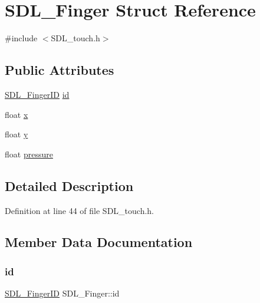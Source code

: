 \hypertarget{struct_s_d_l___finger}{}\section{S\+D\+L\+\_\+\+Finger Struct Reference}
\label{struct_s_d_l___finger}


{\ttfamily \#include $<$S\+D\+L\+\_\+touch.\+h$>$}

\subsection*{Public Attributes}
\begin{DoxyCompactItemize}
\item 
\mbox{\hyperlink{_s_d_l__touch_8h_a5fa58141f78415ca09645af359ad2250}{S\+D\+L\+\_\+\+Finger\+ID}} \mbox{\hyperlink{struct_s_d_l___finger_a3cec630146eeec5bd6299a9387a6f16a}{id}}
\item 
float \mbox{\hyperlink{struct_s_d_l___finger_ab91dfbd03c3215560457fef44e1c7755}{x}}
\item 
float \mbox{\hyperlink{struct_s_d_l___finger_a0a2c7a06ae641940111e03801c672cf9}{y}}
\item 
float \mbox{\hyperlink{struct_s_d_l___finger_a0ecb50c7fd699d59899ac60c941bdee6}{pressure}}
\end{DoxyCompactItemize}


\subsection{Detailed Description}


Definition at line 44 of file S\+D\+L\+\_\+touch.\+h.



\subsection{Member Data Documentation}
\mbox{\label{struct_s_d_l___finger_a3cec630146eeec5bd6299a9387a6f16a}} 
\subsubsection{\texorpdfstring{id}{id}}
{\footnotesize\ttfamily \mbox{\hyperlink{_s_d_l__touch_8h_a5fa58141f78415ca09645af359ad2250}{S\+D\+L\+\_\+\+Finger\+ID}} S\+D\+L\+\_\+\+Finger\+::id}




